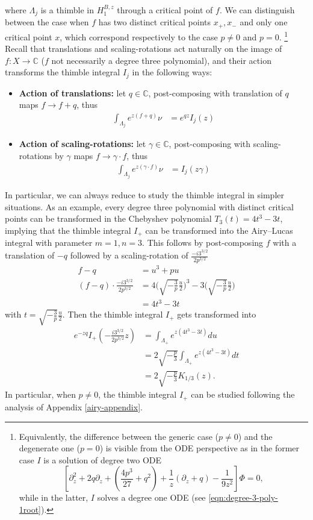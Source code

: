 \documentclass{article}
\newcommand{\C}{\mathbb{C}}
\theoremstyle{definition}
\theoremstyle{plain}
\begin{document}
{where $\Lambda_j$ is a thimble in $H_{1}^{B,z}$ through a critical point of $f$. We can distinguish between the case when $f$ has two distinct critical points $x_+, x_-$ and only one critical point $x$, which correspond respectively to the case $p\neq 0$ and $p=0$. \footnote{Equivalently, the difference between the generic case ($p\neq 0$) and the degenerate one ($p=0$) is visible from the ODE perspective as in the former case $I$ is a solution of degree two ODE \[\left[\partial_z^2 +2q \partial_z+\left(\frac{4p^3}{27}+q^2\right)+\frac{1}{z}\left(\partial_z +q \right)-\frac{1}{9z^2}\right]\Phi=0,\] while in the latter, $I$ solves a degree one ODE (see \eqref{eqn:degree-3-poly-1root}).}
Recall that translations and scaling-rotations act naturally on the image of $f\colon X\to \C$ ($f$ not necessarily a degree three polynomial), and their action transforms the thimble integral $I_j$ in the following ways:
\begin{itemize}
    \item \textbf{Action of translations:} let $q\in\C$, post-composing with translation of $q$ maps $f\to f+q$, thus 
    \begin{align*}
        \int_{\Lambda_j}e^{z (f+q)} \nu &= e^{qz} I_j(z)
    \end{align*}
    \item  \textbf{Action of scaling-rotations:} let $\gamma\in\C$, post-composing with scaling-rotations by $\gamma$ maps $f\to \gamma\cdot f$, thus 
    \begin{align*}
        \int_{\Lambda_j}e^{z (\gamma\cdot f)} \nu &= I_j(z \gamma)
    \end{align*}
\end{itemize}
In particular, we can always reduce to study the thimble integral in simpler situations. 
As an example, every degree three polynomial with distinct critical points can be transformed in the Chebyshev polynomial $T_3(t)=4 t^3-3t$, implying that the thimble integral $I_+$ can be transformed into the Airy--Lucas integral with parameter $m=1, n=3$. This follows by post-composing $f$ with a translation of $-q$ followed by a scaling-rotation of $\frac{ -i 3^{3/2}}{2 p^{3/2}}$
\begin{align*}
    f-q &= u^3 + pu \\
    (f-q) \cdot \frac{ -i 3^{3/2}}{2 p^{3/2}} &= 4 \Big(\sqrt{-\tfrac{3}{p}} \tfrac{u}{2} \Big)^{3} - 3\Big(\sqrt{-\tfrac{3}{p}} \tfrac{u}{2} \Big) \\
    &= 4 t^3- 3t 
\end{align*}
with $t= \sqrt{-\frac{3}{p}} \frac{u}{2}$. Then the thimble integral $I_+$ gets transformed into 
\begin{align*}
    e^{-zq} I_+\left(-\tfrac{i 3^{3/2}}{2 p^{3/2}} z\right)&= \int_{\Lambda_+} e^{z (4t^3-3t)} du\\
    &= 2\sqrt{-\tfrac{p}{3}} \int_{\Lambda_+} e^{z (4t^3-3t)} dt \\
    &= 2\sqrt{-\tfrac{p}{3}} K_{1/3}(z). 
\end{align*}
In particular, when $p\neq 0$, the thimble integral $I_+$ can be studied following the analysis of Appendix \ref{airy-appendix}. 

}
\end{document}
